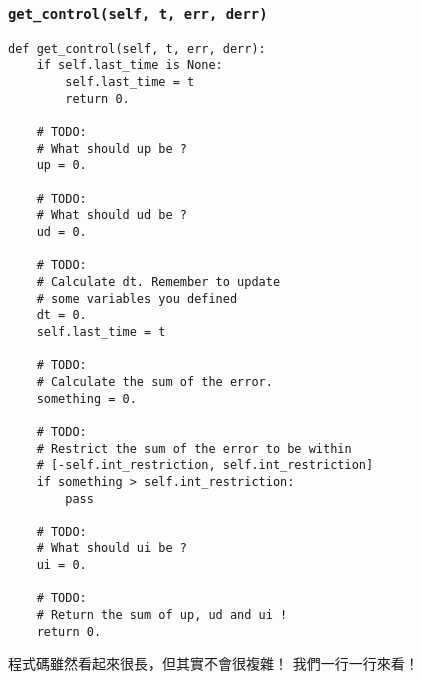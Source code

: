 \documentclass[12pt, a4paper]{article}
\begin{document}
\subsubsection{\texttt{get\_control(self, t, err, derr)}}
\begin{verbatim}
def get_control(self, t, err, derr):
    if self.last_time is None:
        self.last_time = t
        return 0.

    # TODO:
    # What should up be ?
    up = 0. 

    # TODO:
    # What should ud be ?
    ud = 0.

    # TODO:
    # Calculate dt. Remember to update
    # some variables you defined
    dt = 0.
    self.last_time = t

    # TODO:
    # Calculate the sum of the error.
    something = 0.

    # TODO:
    # Restrict the sum of the error to be within
    # [-self.int_restriction, self.int_restriction]
    if something > self.int_restriction:
        pass

    # TODO:
    # What should ui be ?
    ui = 0.

    # TODO:
    # Return the sum of up, ud and ui !
    return 0.
\end{verbatim}
程式碼雖然看起來很長，但其實不會很複雜！ 我們一行一行來看！
\end{document}
